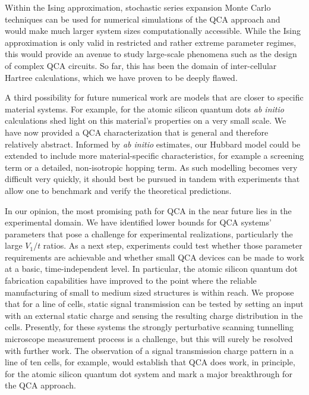 Within the Ising approximation, stochastic series expansion Monte Carlo techniques
can be used for numerical simulations of the QCA approach and would make much
larger system sizes computationally accessible. While the Ising approximation is
only valid in restricted and rather extreme parameter regimes, this would
provide an avenue to study large-scale phenomena such as the design of
complex QCA circuits. So far, this has been the domain of inter-cellular Hartree
calculations, which we have proven to be deeply flawed.

A third possibility for future numerical work are models that are closer to
specific material systems. For example, for the atomic silicon quantum dots
\emph{ab initio} calculations shed light on this material's properties on a very
small scale. We have now provided a QCA characterization that is general and
therefore relatively abstract. Informed by \emph{ab initio} estimates, our
Hubbard model could be extended to include more material-specific
characteristics, for example a screening term or a detailed, non-isotropic
hopping term. As such modelling becomes very difficult very quickly, it should
best be pursued in tandem with experiments that allow one to benchmark and
verify the theoretical predictions.

In our opinion, the most promising path for QCA in the near future lies in the
experimental domain. We have identified lower bounds for QCA systems' parameters
that pose a challenge for experimental realizations, particularly the large
$V_1/t$ ratios. As a next step, experiments could test whether those parameter
requirements are achievable and whether small QCA devices can be made to work at
a basic, time-independent level. In particular, the atomic silicon quantum dot
fabrication capabilities have improved to the point where the reliable
manufacturing of small to medium sized structures is within reach. We propose
that for a line of cells, static signal transmission can be tested by setting an
input with an external static charge and sensing the resulting charge
distribution in the cells. Presently, for these systems the strongly
perturbative scanning tunnelling microscope measurement process is a challenge,
but this will surely be resolved with further work. The observation of a signal
transmission charge pattern in a line of ten cells, for example, would establish
that QCA does work, in principle, for the atomic silicon quantum dot system and
mark a major breakthrough for the QCA approach.
